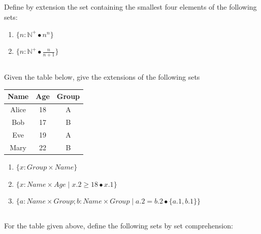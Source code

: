 \documentclass[twocolumn]{article}
\begin{document}
\subsection{}

    Define by extension the set containing the smallest four elements of the following sets:

    \begin{enumerate}
        \item $ \{ n : \mathbb{N}^+ \bullet n^n \} $
        \item $ \{ n : \mathbb{N}^+ \bullet \frac{n}{n+1} \} $
    \end{enumerate}

\subsection{}

    Given the table below, give the extensions of the following sets

    \begin{table}[h!]
        \centering
        \begin{tabular}{c | c | c }
            \toprule
            Name & Age & Group \\
            \midrule
            Alice & 18 & A  \\
            Bob & 17 & B  \\
            Eve & 19 & A \\
            Mary & 22 & B \\
            \bottomrule
        \end{tabular}
    \end{table}

    \begin{enumerate}
        \item $ \{ x : Group \times Name \} $
        \item $ \{ x : Name \times Age \mid x.2 \ge 18 \bullet x.1 \} $
        \item $ \{ a : Name \times Group; b : Name \times Group \mid a.2 = b.2 \bullet \{a.1, b.1\} \} $
    \end{enumerate} 

\subsection{}

    For the table given above, define the following sets by set comprehension:
\end{document}
